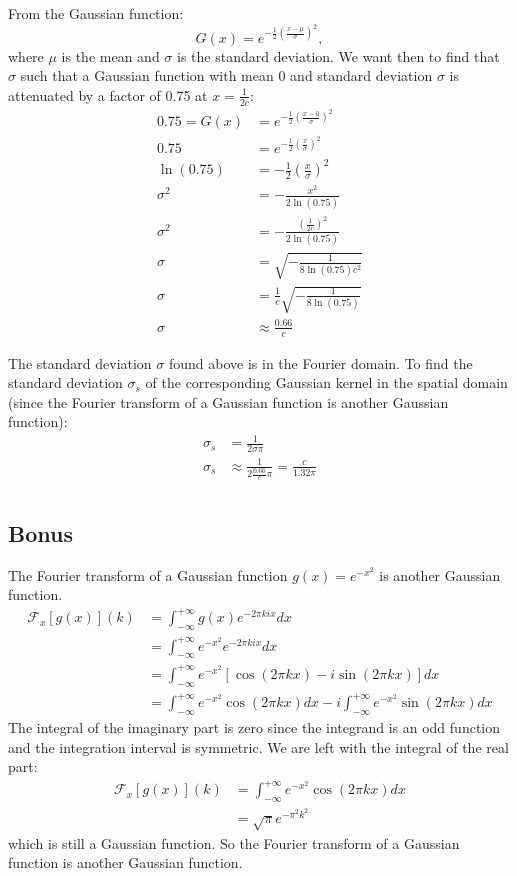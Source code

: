 \documentclass[tikz,14pt,fleqn]{article}
\begin{document}
From the Gaussian function:
\begin{equation*}
    G(x) = e^{-\frac12(\frac{x-\mu}{\sigma})^2},
\end{equation*}where $\mu$ is the mean and $\sigma$ is the standard deviation. 
We want then to find that $\sigma$ such that a Gaussian function with mean 0 and standard deviation $\sigma$ is attenuated by a factor of 0.75 at $x = \frac{1}{2c}$:
\begin{align*}
    0.75 = G(x) &= e^{-\frac12(\frac{x-0}{\sigma})^2} \\
    0.75 &= e^{-\frac12(\frac{x}{\sigma})^2} \\
    \ln(0.75) &= -\frac12(\frac{x}{\sigma})^2 \\
    \sigma^2 &= -\frac{x^2}{2\ln(0.75)} \\
    \sigma^2 &= -\frac{(\frac{1}{2c})^2}{2\ln(0.75)} \\
    \sigma &= \sqrt{-\frac{1}{8\ln(0.75)c^2}} \\
    \sigma &= \frac{1}{c}\sqrt{-\frac{1}{8\ln(0.75)}}\\
    \sigma &\approx \frac{0.66}{c}
\end{align*}

The standard deviation $\sigma$ found above is in the Fourier domain. To find the standard deviation $\sigma_s$ of the corresponding Gaussian kernel in the spatial domain (since the Fourier transform of a Gaussian function is another Gaussian function):
\begin{align*}
    \sigma_s&=\frac{1}{2\sigma \pi} \\
    \sigma_s&\approx\frac{1}{2\frac{0.66}{c} \pi} = \frac{c}{1.32\pi} \\
\end{align*}



\subsection{Bonus}
The Fourier transform of a Gaussian function $g(x) = e^{-x^2}$ is another Gaussian function.
\begin{align*}
    \mathscr{F}_x[g(x)](k) &= \int_{-\infty}^{+\infty}{g(x)e^{-2\pi kix}dx}\\
    &= \int_{-\infty}^{+\infty}{e^{-x^2}e^{-2\pi kix}dx}\\
    &= \int_{-\infty}^{+\infty}{e^{-x^2}[\cos(2\pi kx) - i\sin(2\pi kx)]dx}\\
    &= \int_{-\infty}^{+\infty}{e^{-x^2}\cos(2\pi kx)dx} - i\int_{-\infty}^{+\infty}{e^{-x^2}\sin(2\pi kx)dx}
\end{align*}
The integral of the imaginary part is zero since the integrand is an odd function and the integration interval is symmetric. We are left with the integral of the real part:
\begin{align*}
    \mathscr{F}_x[g(x)](k) &= \int_{-\infty}^{+\infty}{e^{-x^2}\cos(2\pi kx)dx} \\
    &= \sqrt{\pi}e^{-\pi^2k^2}
\end{align*}
which is still a Gaussian function. So the Fourier transform of a Gaussian function is another Gaussian function.
\end{document}
